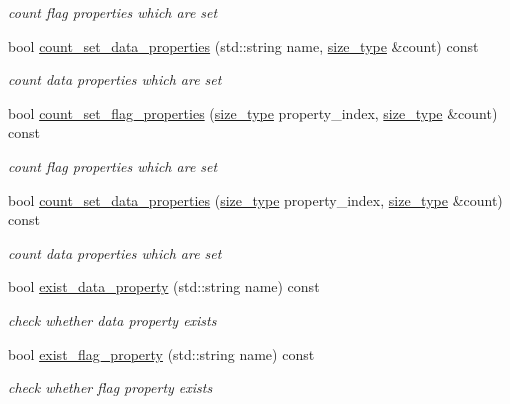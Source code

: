 \begin{DoxyCompactItemize}
\begin{DoxyCompactList}\small\item\em count flag properties which are set \end{DoxyCompactList}\item 
bool \hyperlink{classlb_1_1property__array_a784771d2cc3308fdc6e6a6803f3840af}{count\-\_\-set\-\_\-data\-\_\-properties} (std\-::string name, \hyperlink{classlb_1_1property__array_a76d861a6fb4b99128f627ad951918429}{size\-\_\-type} \&count) const 
\begin{DoxyCompactList}\small\item\em count data properties which are set \end{DoxyCompactList}\item 
bool \hyperlink{classlb_1_1property__array_a3a6cc1f290f44e4d0ce469d81622a1e1}{count\-\_\-set\-\_\-flag\-\_\-properties} (\hyperlink{classlb_1_1property__array_a76d861a6fb4b99128f627ad951918429}{size\-\_\-type} property\-\_\-index, \hyperlink{classlb_1_1property__array_a76d861a6fb4b99128f627ad951918429}{size\-\_\-type} \&count) const 
\begin{DoxyCompactList}\small\item\em count flag properties which are set \end{DoxyCompactList}\item 
bool \hyperlink{classlb_1_1property__array_af6c625c15ee584a55c241f8c41640796}{count\-\_\-set\-\_\-data\-\_\-properties} (\hyperlink{classlb_1_1property__array_a76d861a6fb4b99128f627ad951918429}{size\-\_\-type} property\-\_\-index, \hyperlink{classlb_1_1property__array_a76d861a6fb4b99128f627ad951918429}{size\-\_\-type} \&count) const 
\begin{DoxyCompactList}\small\item\em count data properties which are set \end{DoxyCompactList}\item 
bool \hyperlink{classlb_1_1property__array_aee2356dcde19da93636676544422ab7b}{exist\-\_\-data\-\_\-property} (std\-::string name) const 
\begin{DoxyCompactList}\small\item\em check whether data property exists \end{DoxyCompactList}\item 
bool \hyperlink{classlb_1_1property__array_aa38854a0e43bf935dc1653fd489fa9f3}{exist\-\_\-flag\-\_\-property} (std\-::string name) const 
\begin{DoxyCompactList}\small\item\em check whether flag property exists \end{DoxyCompactList}\end{DoxyCompactItemize}
